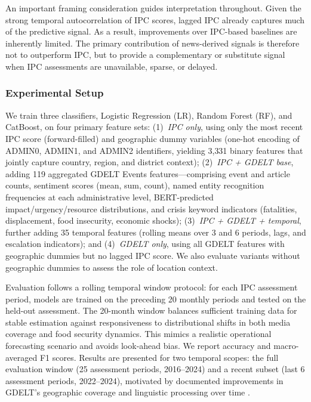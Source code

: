 \documentclass{article}
\begin{document}
An important framing consideration guides interpretation throughout. Given the strong temporal autocorrelation of IPC scores, lagged IPC already captures much of the predictive signal. As a result, improvements over IPC-based baselines are inherently limited. The primary contribution of news-derived signals is therefore not to outperform IPC, but to provide a complementary or substitute signal when IPC assessments are unavailable, sparse, or delayed.

\subsubsection{Experimental Setup}

We train three classifiers, Logistic Regression (LR), Random Forest (RF), and CatBoost, on four primary feature sets: (1)~\textit{IPC only}, using only the most recent IPC score (forward-filled) and geographic dummy variables (one-hot encoding of ADMIN0, ADMIN1, and ADMIN2 identifiers, yielding 3{,}331 binary features that jointly capture country, region, and district context); (2)~\textit{IPC + GDELT base}, adding 119 aggregated GDELT Events features---comprising event and article counts, sentiment scores (mean, sum, count), named entity recognition frequencies at each administrative level, BERT-predicted impact/urgency/resource distributions, and crisis keyword indicators (fatalities, displacement, food insecurity, economic shocks); (3)~\textit{IPC + GDELT + temporal}, further adding 35 temporal features (rolling means over 3 and 6 periods, lags, and escalation indicators); and (4)~\textit{GDELT only}, using all GDELT features with geographic dummies but no lagged IPC score. We also evaluate variants without geographic dummies to assess the role of location context.

Evaluation follows a rolling temporal window protocol: for each IPC assessment period, models are trained on the preceding 20 monthly periods and tested on the held-out assessment. The 20-month window balances sufficient training data for stable estimation against responsiveness to distributional shifts in both media coverage and food security dynamics. This mimics a realistic operational forecasting scenario and avoids look-ahead bias. We report accuracy and macro-averaged F1 scores. Results are presented for two temporal scopes: the full evaluation window (25 assessment periods, 2016--2024) and a recent subset (last 6 assessment periods, 2022--2024), motivated by documented improvements in GDELT's geographic coverage and linguistic processing over time \citep{leetaru2013gdelt}.
\end{document}
